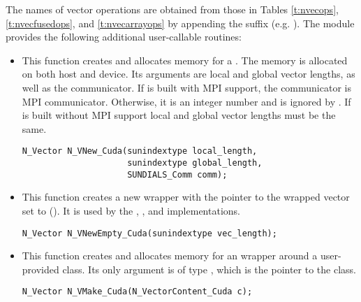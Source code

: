 The names of vector operations are obtained from those in Tables \ref{t:nvecops},
\ref{t:nvecfusedops}, and \ref{t:nvecarrayops} by appending the suffix 
(e.g. ).
The module {\nveccuda}  provides the following additional user-callable routines:
\begin{itemize}

  

\item {}
 
  This function creates and allocates memory for a {\cuda} .
  The memory is allocated on both host and device. Its arguments are local
  and global vector lengths, as well as the {\sundials} communicator. If   
  {\sundials} is built with MPI support, the communicator is MPI communicator.
  Otherwise, it is an integer number and is ignored by .
  If {\sundials} is built without MPI support local and global vector
  lengths must be the same.

\begin{verbatim}
N_Vector N_VNew_Cuda(sunindextype local_length,
                     sunindextype global_length,
                     SUNDIALS_Comm comm);
\end{verbatim}

  

\item {}
 
  This function creates a new {\nvector} wrapper with the pointer to
  the wrapped {\cuda} vector set to (). It is used by the 
  , , and  
  implementations. 

\begin{verbatim}
N_Vector N_VNewEmpty_Cuda(sunindextype vec_length);
\end{verbatim}

  

\item {}
  
  This function creates and allocates memory for an {\nveccuda}
  wrapper around a user-provided  class. 
  Its only argument is of type , which
  is the pointer to the class.

\begin{verbatim}
N_Vector N_VMake_Cuda(N_VectorContent_Cuda c);
\end{verbatim}


\end{itemize}
